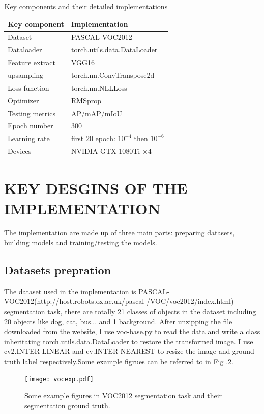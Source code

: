 \documentclass[transmag]{IEEEtran}
\begin{document}
\begin{table}
  \centering
\caption{Key components and their detailed implementations}
\label{table}
\setlength{\tabcolsep}{3pt}
\begin{tabular}{|p{75pt}|p{125pt}|}
\hline
Key component & Implementation \\
\hline
Dataset    &        PASCAL-VOC2012             \\
Dataloader &   torch.utils.data.DataLoader        \\
Feature extract   &      VGG16               \\
upsampling   &       torch.nn.ConvTranspose2d               \\
Loss function   &        torch.nn.NLLLoss             \\
Optimizer   &           RMSprop          \\
Testing metrics  &      AP/mAP/mIoU               \\
Epoch number & 300 \\
Learning rate & first 20 epoch: $10^{-4}$ then $10^{-6}$ \\
 Devices            &      NVIDIA GTX 1080Ti $\times4$              \\

\hline

\hline
\end{tabular}
\label{tab1}
\end{table}





\section{KEY DESGINS OF THE IMPLEMENTATION}
The implementation are made up of three main parts: preparing datasets, building models and training/testing the models.
\subsection{Datasets prepration}
 The dataset used in the implementation is PASCAL-VOC2012(http://host.robots.ox.ac.uk/pascal
 /VOC/voc2012/index.html) segmentation task, there are
 totally 21 classes of objects in the dataset including 20 objects like dog, cat, bus... and 1 background. After unzipping the file downloaded from
 the website, I use voc-base.py to read the data and write a class inheritating torch.utils.data.DataLoader to restore the transformed image.
I use cv2.INTER-LINEAR and cv.INTER-NEAREST to resize the image and ground truth label respectively.Some example figrues can be referred to in 
Fig .2.
\begin{figure}
  \centerline{\texttt{[image: vocexp.pdf]}}
  \caption{Some example figures in VOC2012
  segmentation task and their segmentation ground truth.\label{fig2}}
  \end{figure}
\end{document}
